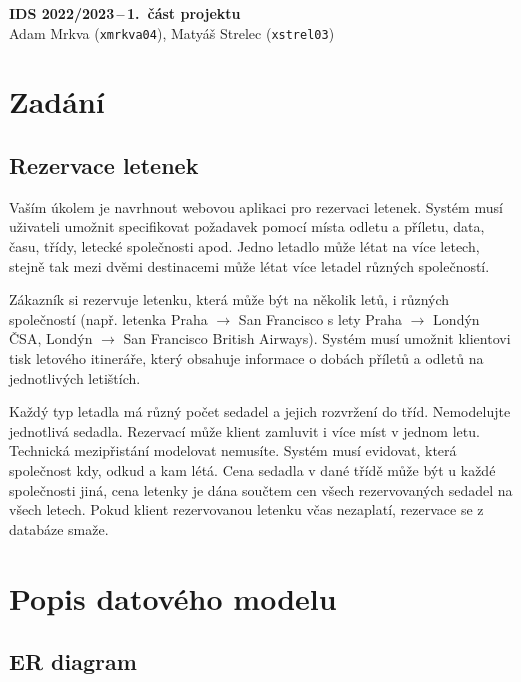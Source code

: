 \documentclass[11pt,a4paper,landscape]{article}
\begin{document}
    \noindent
    \Large{\textbf{IDS 2022/2023\,--\,1.~část projektu}} \\
    \normalsize
    Adam Mrkva (\verb|xmrkva04|), Matyáš Strelec (\verb|xstrel03|)
    
\begin{multicols*}{2}

    \section{Zadání}
    
        \subsection*{Rezervace letenek}
        
            Vaším úkolem je navrhnout webovou aplikaci pro rezervaci letenek. Systém musí uživateli umožnit specifikovat požadavek pomocí místa odletu a příletu, data, času, třídy, letecké společnosti apod. Jedno letadlo může létat na více letech, stejně tak mezi dvěmi destinacemi může létat více letadel různých společností.
            
            Zákazník si rezervuje letenku, která může být na několik letů, i různých společností (např. letenka Praha $\rightarrow$ San Francisco s lety Praha $\rightarrow$ Londýn ČSA, Londýn $\rightarrow$ San Francisco British Airways). Systém musí umožnit klientovi tisk letového itineráře, který obsahuje informace o dobách příletů a odletů na jednotlivých letištích.
            
            Každý typ letadla má různý počet sedadel a jejich rozvržení do tříd. Nemodelujte jednotlivá sedadla. Rezervací může klient zamluvit i více míst v jednom letu. Technická mezipřistání modelovat nemusíte. Systém musí evidovat, která společnost kdy, odkud a kam létá. Cena sedadla v dané třídě může být u každé společnosti jiná, cena letenky je dána součtem cen všech rezervovaných sedadel na všech letech. Pokud klient rezervovanou letenku včas nezaplatí, rezervace se z databáze smaže. 

    \section{Popis datového modelu}
    
        \subsection{ER diagram}
        

\end{multicols*}
\end{document}
